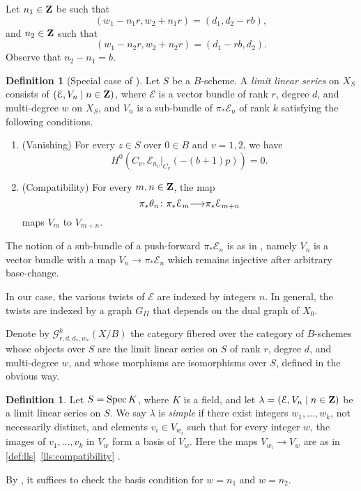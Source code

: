 \documentclass[11pt,reqno]{amsart}
\theoremstyle{plain}
\theoremstyle{definition}
\newtheorem{definition}[theorem]{Definition}
\theoremstyle{remark}
\numberwithin{equation}{section}
\renewcommand{\to}{{\longrightarrow}}
\numberwithin{equation}{section}
\begin{document}
Let $n_1 \in {\bf Z}$  be such that
\[ (w_1 - n_1r, w_2+n_1r) = (d_1, d_2-rb),\]
and $n_2 \in {\bf Z}$ such that
\[ (w_1-n_2r, w_2+n_2r) = (d_1-rb, d_2).\]
Observe that $n_2 - n_1 = b$.
\begin{definition}[{Special case of \cite[Definition~3.3.2]{oss:14}}]
  \label{def:lls}
  Let $S$ be a $B$-scheme.
  A \emph{limit linear series} on $X_S$ consists of $(\mathcal E, V_n \mid n \in {\bf Z})$, where $\mathcal E$ is a vector bundle of rank $r$, degree $d$, and multi-degree $w$ on $X_S$, and $V_n$ is a sub-bundle of $\pi_* \mathcal E_n$ of rank $k$ satisfying the following conditions.
  \begin{enumerate}
  \item (Vanishing)
    \label{lls:vanishing}
    For every $z \in S$ over $0 \in B$ and $v = 1,2$, we have
    \[ H^0(C_v, \mathcal E_{n_v}|_{C_v}(-(b+1)p)) = 0.\]
  \item (Compatibility)
    \label{lls:compatibility}
    For every $m, n \in {\bf Z}$, the map
    \[\pi_*\theta_n \from \pi_*\mathcal E_m \to \pi_*\mathcal E_{m+n}\] maps
    $V_m$ to $V_{m+n}$.
  \end{enumerate}
\end{definition}
The notion of a sub-bundle of a push-forward $\pi_* \mathcal E_n$ is as in \cite[Definition~B.2.1]{oss:14}, namely $V_n$ is a vector bundle with a map $V_n \to \pi_* \mathcal E_n$ which remains injective after arbitrary base-change.
\begin{remark}
  In our case, the various twists of $\mathcal E$ are indexed by integers $n$.
  In general, the twists are indexed by a graph $G_{II}$ that depends on the dual graph of $X_0$.
\end{remark}

Denote by ${\mathcal G}^k_{r,d,d_*, w_*}(X/B)$ the category fibered over the category of $B$-schemes whose objects over $S$ are the limit linear series on $S$ of rank $r$, degree $d$, and multi-degree $w$, and whose morphisms are isomorphisms over $S$, defined in the obvious way.

\begin{definition}\label{def:simple_lls}
Let $S = \operatorname{Spec} K$, where $K$ is a field, and let $\lambda = (\mathcal E, V_n \mid n \in {\bf Z})$ be a limit linear series on $S$.
We say  $\lambda$ is \emph{simple} if there exist integers $w_1, \dots, w_k$, not necessarily distinct, and elements $v_i \in V_{w_i}$ such that for every integer $w$, the images of $v_1, \dots, v_k$ in $V_w$ form a basis of $V_w$.
Here the maps $V_{w_i} \to V_w$ are as in \autoref{def:lls}~\eqref{lls:compatibility} .
\end{definition}
\begin{remark}\label{rem:simple_lls}
  By \cite[Lemma~3.4.14]{oss:14}, it suffices to check the basis condition for $w = n_1$ and $w = n_2$.
\end{remark}
\end{document}
